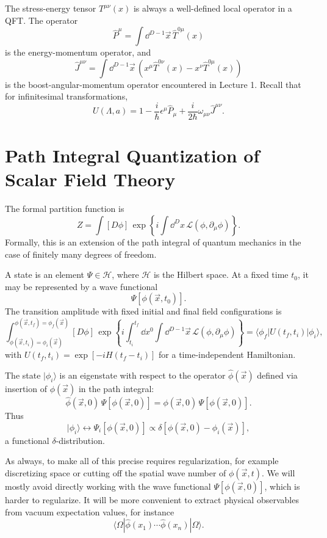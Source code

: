 The stress-energy tensor \(T^{\mu\nu}(x)\) is always a well-defined local
operator in a QFT. The operator
\[
  \hat P^\mu
  =
  \int\dd^{D-1}\vec x\,\hat T^{0\mu}(x)
\]
is the energy-momentum operator, and
\[
  \hat J^{\mu\nu}
  =
  \int\dd^{D-1}\vec x\,
  \left(
    x^\mu \hat T^{0\nu}(x)
    -
    x^\nu \hat T^{0\mu}(x)
  \right)
\]
is the boost-angular-momentum operator encountered in Lecture 1. Recall that
for infinitesimal transformations,
\[
  U(\Lambda,a)
  =
  1
  -\frac{i}{\hbar}\epsilon^\mu\hat P_\mu
  +\frac{i}{2\hbar}\omega_{\mu\nu}\hat J^{\mu\nu}.
\]

\section{Path Integral Quantization of Scalar Field Theory}

The formal partition function is
\[
  Z
  =
  \int [D\phi]\,
  \exp\left\{
    i\int \dd^D x\,\mathcal L(\phi,\partial_\mu\phi)
  \right\}.
\]
Formally, this is an extension of the path integral of quantum mechanics in
the case of finitely many degrees of freedom.

A state is an element \(\Psi\in\mathcal H\), where \(\mathcal H\) is the
Hilbert space. At a fixed time \(t_0\), it may be represented by a wave
functional
\[
  \Psi[\phi(\vec x,t_0)].
\]
The transition amplitude with fixed initial and final field configurations is
\[
  \int_{\phi(\vec x,t_i)=\phi_i(\vec x)}^{\phi(\vec x,t_f)=\phi_f(\vec x)}
  [D\phi]\,
  \exp\left\{
    i\int_{t_i}^{t_f}\dd x^0
    \int \dd^{D-1}\vec x\,
    \mathcal L(\phi,\partial_\mu\phi)
  \right\}
  =
  \langle \phi_f|U(t_f,t_i)|\phi_i\rangle,
\]
with \(U(t_f,t_i)=\exp[-iH(t_f-t_i)]\) for a time-independent Hamiltonian.

The state \(|\phi_i\rangle\) is an eigenstate with respect to the operator
\(\hat\phi(\vec x)\) defined via insertion of \(\phi(\vec x)\) in the path
integral:
\[
  \hat\phi(\vec x,0)\,\Psi[\phi(\vec x,0)]
  =
  \phi(\vec x,0)\,\Psi[\phi(\vec x,0)].
\]
Thus
\[
  |\phi_i\rangle
  \longleftrightarrow
  \Psi_i[\phi(\vec x,0)]
  \propto
  \delta[\phi(\vec x,0)-\phi_i(\vec x)],
\]
a functional \(\delta\)-distribution.

As always, to make all of this precise requires regularization, for example
discretizing space or cutting off the spatial wave number of
\(\phi(\vec x,t)\). We will mostly avoid directly working with the wave
functional \(\Psi[\phi(\vec x,0)]\), which is harder to regularize. It will
be more convenient to extract physical observables from vacuum expectation
values, for instance
\[
  \langle\Omega|
  \hat\phi(x_1)\cdots\hat\phi(x_n)
  |\Omega\rangle.
\]

